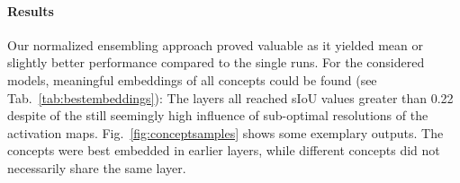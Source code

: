 \paragraph{Results}
Our normalized ensembling approach proved valuable as it yielded
mean or slightly better performance compared to the single runs.
For the considered models, meaningful embeddings of all concepts could
be found (see Tab.~\ref{tab:bestembeddings}): The layers all reached
sIoU values greater than 0.22
despite of the still seemingly high influence of sub-optimal
resolutions of the activation maps.
Fig.~\ref{fig:conceptsamples} shows some exemplary outputs.
The concepts were best embedded in earlier layers,
while different concepts did not necessarily share the same layer.
